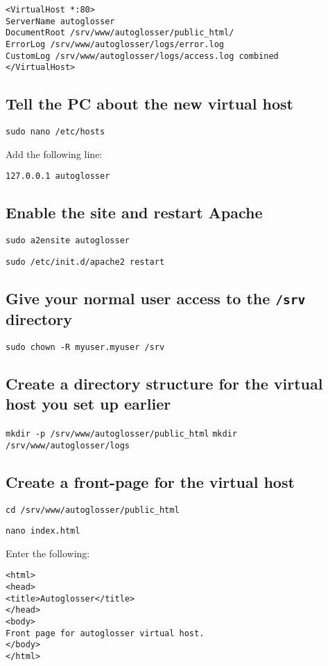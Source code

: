 \documentclass[a4paper,10pt]{article}
\begin{document}
{\begin{verbatim}
<VirtualHost *:80>
ServerName autoglosser
DocumentRoot /srv/www/autoglosser/public_html/
ErrorLog /srv/www/autoglosser/logs/error.log
CustomLog /srv/www/autoglosser/logs/access.log combined
</VirtualHost>
\end{verbatim}

\subsection{Tell the PC about the new virtual host}

\texttt{sudo nano /etc/hosts}

Add the following line:

\texttt{127.0.0.1	autoglosser}

\subsection{Enable the site and restart Apache}

\texttt{sudo a2ensite autoglosser}

\texttt{sudo /etc/init.d/apache2 restart}

\subsection{Give your normal user access to the \texttt{/srv} directory}

\texttt{sudo chown -R myuser.myuser /srv}

\subsection{Create a directory structure for the virtual host you set up earlier}

\texttt{mkdir -p /srv/www/autoglosser/public\_html}
\texttt{mkdir /srv/www/autoglosser/logs}

\subsection{Create a front-page for the virtual host}
\label{subsec:create-front-page}

\texttt{cd /srv/www/autoglosser/public\_html}

\texttt{nano index.html}

Enter the following:

\begin{verbatim}
<html>
<head>
<title>Autoglosser</title>
</head>
<body>
Front page for autoglosser virtual host.
</body>
</html>
\end{verbatim}

}
\end{document}
